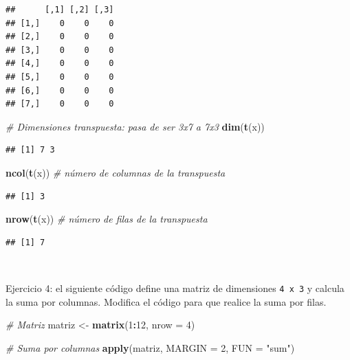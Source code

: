 \documentclass[11pt,]{book}
\newenvironment{Shaded}{\begin{snugshade}}{\end{snugshade}}
\newcommand{\CommentTok}[1]{\textcolor[rgb]{0.37,0.37,0.37}{\textit{#1}}}
\newcommand{\DataTypeTok}[1]{\textcolor[rgb]{0.27,0.27,0.27}{#1}}
\newcommand{\DecValTok}[1]{\textcolor[rgb]{0.06,0.06,0.06}{#1}}
\newcommand{\KeywordTok}[1]{\textcolor[rgb]{0.27,0.27,0.27}{\textbf{#1}}}
\newcommand{\NormalTok}[1]{#1}
\newcommand{\OperatorTok}[1]{\textcolor[rgb]{0.43,0.43,0.43}{\textbf{#1}}}
\newcommand{\StringTok}[1]{\textcolor[rgb]{0.5,0.5,0.5}{#1}}
\begin{document}
\begin{verbatim}
##      [,1] [,2] [,3]
## [1,]    0    0    0
## [2,]    0    0    0
## [3,]    0    0    0
## [4,]    0    0    0
## [5,]    0    0    0
## [6,]    0    0    0
## [7,]    0    0    0
\end{verbatim}

\begin{Shaded}
\begin{Highlighting}[]
\CommentTok{# Dimensiones transpuesta: pasa de ser 3x7 a 7x3}
\KeywordTok{dim}\NormalTok{(}\KeywordTok{t}\NormalTok{(x))}
\end{Highlighting}
\end{Shaded}

\begin{verbatim}
## [1] 7 3
\end{verbatim}

\begin{Shaded}
\begin{Highlighting}[]
\KeywordTok{ncol}\NormalTok{(}\KeywordTok{t}\NormalTok{(x)) }\CommentTok{# número de columnas de la transpuesta}
\end{Highlighting}
\end{Shaded}

\begin{verbatim}
## [1] 3
\end{verbatim}

\begin{Shaded}
\begin{Highlighting}[]
\KeywordTok{nrow}\NormalTok{(}\KeywordTok{t}\NormalTok{(x)) }\CommentTok{# número de filas de la transpuesta}
\end{Highlighting}
\end{Shaded}

\begin{verbatim}
## [1] 7
\end{verbatim}

~

Ejercicio 4: el siguiente código define una matriz de dimensiones \texttt{4\ x\ 3} y calcula la suma por columnas. Modifica el código para que realice la suma por filas.

\begin{Shaded}
\begin{Highlighting}[]
\CommentTok{# Matriz}
\NormalTok{matriz <-}\StringTok{ }\KeywordTok{matrix}\NormalTok{(}\DecValTok{1}\OperatorTok{:}\DecValTok{12}\NormalTok{, }\DataTypeTok{nrow =} \DecValTok{4}\NormalTok{)}

\CommentTok{# Suma por columnas}
\KeywordTok{apply}\NormalTok{(matriz, }\DataTypeTok{MARGIN =} \DecValTok{2}\NormalTok{, }\DataTypeTok{FUN =} \StringTok{"sum"}\NormalTok{)}
\end{Highlighting}
\end{Shaded}
\end{document}
